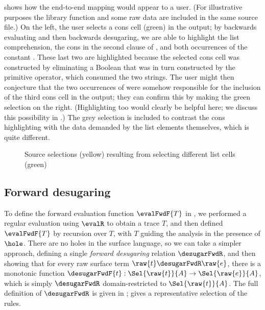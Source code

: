  shows how the end-to-end mapping would appear to a user. (For illustrative purposes the library function  and some raw data are included in the same source file.) On the left, the user selects a cons cell (green) in the output; by backwards evaluating and then backwards desugaring, we are able to highlight the list comprehension, the cons in the second clause of , and both occurrences of the constant . These last two are highlighted because the selected cons cell was constructed by eliminating a Boolean that was in turn constructed by the primitive \kw{==} operator, which consumed the two strings. The user might then conjecture that the two occurrences of  were somehow responsible for the inclusion of the third cons cell in the output; they can confirm this by making the green selection on the right. (Highlighting \kw{==} too would clearly be helpful here; we discuss this possibility in .) The grey selection is included to contrast the cons highlighting with the data demanded by the list elements themselves, which is quite different.

\begin{figure}
   \begin{subfigure}{0.48\textwidth}
      \small
      
   \end{subfigure}
   \hfill
   \begin{subfigure}{0.48\textwidth}
      \small
      
   \end{subfigure}
   \vspace{-3mm}
   \caption{Source selections (yellow) resulting from selecting different list cells (green)}
   \vspace{-2mm}
\label{fig:surface-language:example-1}
\end{figure}

\subsection{Forward desugaring}

To define the forward evaluation function $\evalFwdF{T}$ in , we performed a regular evaluation using $\evalR$ to obtain a trace $T$, and then defined $\evalFwdF{T}$ by recursion over $T$, with $T$ guiding the analysis in the presence of $\hole$. There are no holes in the surface language, so we can take a simpler approach, defining a single \emph{forward desugaring} relation $\desugarFwdR$, and then showing that for every raw surface term $\raw{t} \desugarFwdR \raw{e}$, there is a monotonic function $\desugarFwdF{t}: \Sel{\raw{t}}{A} \to \Sel{\raw{e}}{A}$, which is simply $\desugarFwdR$ domain-restricted to $\Sel{\raw{t}}{A}$. The full definition of $\desugarFwdR$ is \ifappendices given in  \else \IncludedWithSupplementaryMaterial \fi;  gives a representative selection of the rules.

